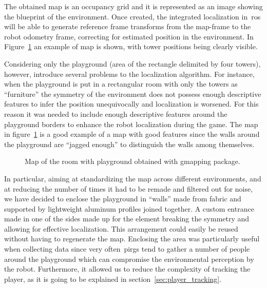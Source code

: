 The obtained map is an occupancy grid and it is represented as an image showing the blueprint of the environment. Once created, the integrated localization in~\gls{ros} will be able to generate reference frame transforms from the map-frame to the robot odometry frame, correcting for estimated position in the environment. In Figure~\ref{fig:playground_map} an example of map is shown, with tower positions being clearly visible.

Considering only the playground (area of the rectangle delimited by four towers), however, introduce several problems to the localization algorithm. For instance, when the playground is put in a rectangular room with only the towers as ``furniture'' the symmetry of the environment does not possess enough descriptive features to infer the position unequivocally and localization is worsened. For this reason it was needed to include enough descriptive features around the playground borders to enhance the robot localization during the game. The map in figure~\ref{fig:playground_map} is a good example of a map with good features since the walls around the playground are ``jagged enough'' to distinguish the walls among themselves. 

\begin{figure}[h]
	\centering
	\caption{Map of the room with playground obtained with gmapping package.} 
	\label{fig:playground_map}
\end{figure}

In particular, aiming at standardizing the map across different environments, and at reducing the number of times it had to be remade and filtered out for noise, we have decided to enclose the playground in ``walls'' made from fabric and supported by lightweight aluminum profiles joined together. A custom entrance made in one of the sides made up for the element breaking the symmetry and allowing for effective localization. This arrangement could easily be reused without having to regenerate the map. Enclosing the area was particularly useful when collecting data since very often~\glspl{pirg} tend to gather a number of people around the playground which can compromise the environmental perception by the robot. Furthermore, it allowed us to reduce the complexity of tracking the player, as it is going to be explained in section~\ref{sec:player_tracking}.

